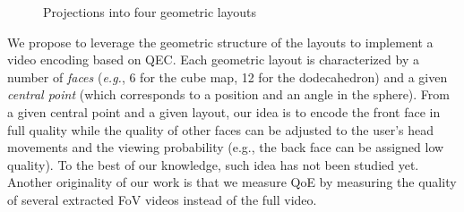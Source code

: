 \begin{figure}[t]
\centering
{}
\caption{Projections into four geometric layouts}\label{fig:mapping}
\end{figure}

We propose to leverage the geometric structure of the layouts
to implement a video encoding based on \ac{QEC}. Each geometric layout is characterized
by a number of \emph{faces} (\textit{e.g.}, 6 for
the cube map, 12 for the dodecahedron) and a given \emph{central point} (which corresponds
to a position and an angle in the sphere).
From a given central point and a given layout, our idea is to encode the front face in full
quality while the quality of other faces can be adjusted to the user's head movements and the viewing
probability (e.g., the back face can be assigned low quality).
To the best of our knowledge, such idea has not been studied yet. Another originality of
our work is that we measure \ac{QoE} by measuring the quality of several extracted
\ac{FoV}
videos instead
of the full video.

